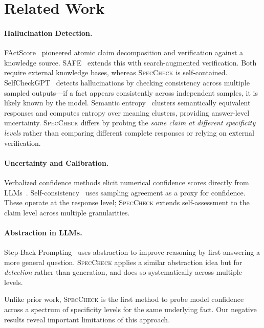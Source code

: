 \documentclass{article}
\newcommand{\speccheck}{\textsc{SpecCheck}}
\begin{document}
\section{Related Work}
\label{sec:related}

\paragraph{Hallucination Detection.}
FActScore~\citep{min2023factscore} pioneered atomic claim decomposition and verification against a knowledge source.
SAFE~\citep{wei2024longform} extends this with search-augmented verification.
Both require external knowledge bases, whereas \speccheck{} is self-contained.
SelfCheckGPT~\citep{manakul2023selfcheckgpt} detects hallucinations by checking consistency across multiple sampled outputs---if a fact appears consistently across independent samples, it is likely known by the model.
Semantic entropy~\citep{farquhar2024detecting} clusters semantically equivalent responses and computes entropy over meaning clusters, providing answer-level uncertainty.
\speccheck{} differs by probing the \emph{same claim at different specificity levels} rather than comparing different complete responses or relying on external verification.

\paragraph{Uncertainty and Calibration.}
Verbalized confidence methods elicit numerical confidence scores directly from LLMs~\citep{kadavath2022language}.
Self-consistency~\citep{wang2023selfconsistency} uses sampling agreement as a proxy for confidence.
These operate at the response level; \speccheck{} extends self-assessment to the claim level across multiple granularities.

\paragraph{Abstraction in LLMs.}
Step-Back Prompting~\citep{zheng2024stepback} uses abstraction to improve reasoning by first answering a more general question.
\speccheck{} applies a similar abstraction idea but for \emph{detection} rather than generation, and does so systematically across multiple levels.

Unlike prior work, \speccheck{} is the first method to probe model confidence across a spectrum of specificity levels for the same underlying fact.
Our negative results reveal important limitations of this approach.
\end{document}
